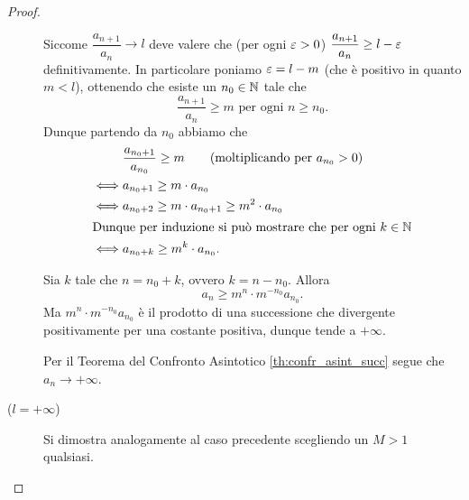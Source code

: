 \begin{proof}
\begin{description}
        Siccome $\dfrac{a_{n+1}}{a_n} \to l$ deve valere che (per ogni $\varepsilon > 0$) $\dfrac{a_{n+1}}{a_n} \geq l - \varepsilon$ definitivamente. In particolare poniamo $\varepsilon = l - m$ (che è positivo in quanto $m < l$), ottenendo che esiste un $n_0 \in \mathbb{N}$ tale che \[
            \frac{a_{n+1}}{a_n} \geq m \text{    per ogni } n \geq n_0.
        \]
        Dunque partendo da $n_0$ abbiamo che \begin{align*}
            &\frac{a_{n_0+1}}{a_{n_0}} \geq m \tag{moltiplicando per $a_{n_0} > 0$}\\
            \iff &a_{n_0+1} \geq m \cdot a_{n_0}\\
            \iff &a_{n_0+2} \geq m \cdot a_{n_0 + 1} \geq m^2 \cdot a_{n_0}\\
            \intertext{Dunque per induzione si può mostrare che per ogni $k \in \N$}
            \iff &a_{n_0+k} \geq m^k \cdot a_{n_0}.
        \end{align*}

        Sia $k$ tale che $n = n_0 + k$, ovvero $k = n - n_0$. Allora \[
            a_n \geq m^n \cdot m^{-n_0}a_{n_0}. 
        \] Ma $m^n \cdot m^{-n_0}a_{n_0}$ è il prodotto di una successione che divergente positivamente per una costante positiva, dunque tende a $+\infty$.

        Per il Teorema del Confronto Asintotico \ref{th:confr_asint_succ} segue che $a_n \to +\infty$.
        \item[($l = +\infty$)] Si dimostra analogamente al caso precedente scegliendo un $M > 1$ qualsiasi. \qedhere
    \end{description}
\end{proof}


